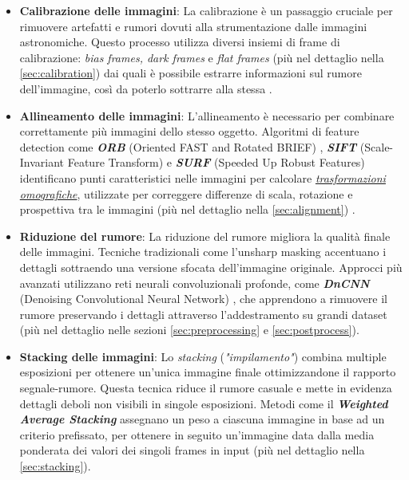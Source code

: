 \begin{itemize}
\item \textbf{Calibrazione delle immagini}: La calibrazione è un passaggio cruciale per rimuovere artefatti e rumori dovuti alla strumentazione dalle immagini astronomiche. Questo processo utilizza diversi insiemi di frame di calibrazione: \textit{bias frames, dark frames} e \textit{flat frames} (più nel dettaglio nella \cref{sec:calibration}) dai quali è possibile estrarre informazioni sul rumore dell'immagine, così da poterlo sottrarre alla stessa \cite{calibration}.

\item \textbf{Allineamento delle immagini}: L'allineamento è necessario per combinare correttamente più immagini dello stesso oggetto. Algoritmi di feature detection come \textit{\textbf{ORB}} (Oriented FAST and Rotated BRIEF) \cite{orb}, \textit{\textbf{SIFT}} (Scale-Invariant Feature Transform) e \textit{\textbf{SURF}} (Speeded Up Robust Features) identificano punti caratteristici nelle immagini per calcolare \hyperref[subsec:homography]{\textit{trasformazioni omografiche}}, utilizzate per correggere differenze di scala, rotazione e prospettiva tra le immagini (più nel dettaglio nella \cref{sec:alignment}) \cite{multiwavelength_image_proc} \cite{improved_solan}.

\item \textbf{Riduzione del rumore}: La riduzione del rumore migliora la qualità finale delle immagini. Tecniche tradizionali come l'unsharp masking \cite{multiwavelength_image_proc} accentuano i dettagli sottraendo una versione sfocata dell'immagine originale. Approcci più avanzati utilizzano reti neurali convoluzionali profonde, come \textit{\textbf{DnCNN}} (Denoising Convolutional Neural Network) \cite{DnCnn}, che apprendono a rimuovere il rumore preservando i dettagli attraverso l'addestramento su grandi dataset (più nel dettaglio nelle sezioni \ref{sec:preprocessing} e \ref{sec:postprocess}).

\item \textbf{Stacking delle immagini}: Lo \textit{stacking} (\textit{"impilamento"}) combina multiple esposizioni per ottenere un'unica immagine finale ottimizzandone il rapporto segnale-rumore. Questa tecnica riduce il rumore casuale e mette in evidenza dettagli deboli non visibili in singole esposizioni. Metodi come il \textbf{\textit{Weighted Average Stacking}} assegnano un peso a ciascuna immagine in base ad un criterio prefissato, per ottenere in seguito un'immagine data dalla media ponderata dei valori dei singoli frames in input (più nel dettaglio nella \cref{sec:stacking}).
\end{itemize}

